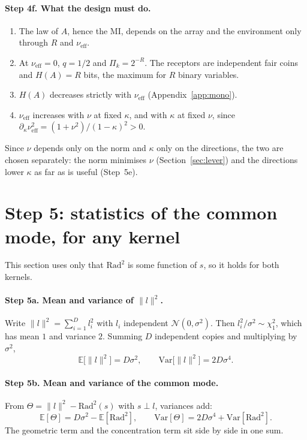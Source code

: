 \documentclass[11pt,a4paper]{article}
\newcommand{\EE}{\mathbb{E}}
\newcommand{\Var}{\mathrm{Var}}
\newcommand{\nueff}{\nu_{\mathrm{eff}}}
\begin{document}
\paragraph{Step 4f. What the design must do.}
\begin{enumerate}
  \item The law of $A$, hence the MI, depends on the array and the environment only
    through $R$ and $\nueff$.
  \item At $\nueff=0$, $q=1/2$ and $\Pi_k=2^{-R}$. The receptors are independent fair
    coins and $H(A)=R$ bits, the maximum for $R$ binary variables.
  \item $H(A)$ decreases strictly with $\nueff$ (Appendix~\ref{app:mono}).
  \item $\nueff$ increases with $\nu$ at fixed $\kappa$, and with $\kappa$ at fixed $\nu$,
    since $\partial_\kappa\nueff^2=(1+\nu^2)/(1-\kappa)^2>0$.
\end{enumerate}
Since $\nu$ depends only on the norm and $\kappa$ only on the directions, the two are
chosen separately: the norm minimises $\nu$ (Section~\ref{sec:lever}) and the directions
lower $\kappa$ as far as is useful (Step~5e).

\section{Step 5: statistics of the common mode, for any kernel}
\label{sec:step5}

This section uses only that $\mathrm{Rad}^2$ is some function of $s$, so it holds for
both kernels.

\paragraph{Step 5a. Mean and variance of $\|l\|^2$.} Write
$\|l\|^2=\sum_{i=1}^D l_i^2$ with $l_i$ independent $\mathcal{N}(0,\sigma^2)$. Then
$l_i^2/\sigma^2\sim\chi^2_1$, which has mean $1$ and variance $2$. Summing $D$
independent copies and multiplying by $\sigma^2$,
\begin{equation}
  \EE\big[\|l\|^2\big]=D\sigma^2, \qquad \Var\big[\|l\|^2\big]=2D\sigma^4 .
  \label{eq:radial}
\end{equation}

\paragraph{Step 5b. Mean and variance of the common mode.} From
$\Theta=\|l\|^2-\mathrm{Rad}^2(s)$ with $s\perp l$, variances add:
\begin{equation}
  \EE[\Theta]=D\sigma^2-\EE[\mathrm{Rad}^2],
  \qquad
  \Var[\Theta]=2D\sigma^4+\Var[\mathrm{Rad}^2].
  \label{eq:Thetastats}
\end{equation}
The geometric term and the concentration term sit side by side in one sum.
\end{document}
